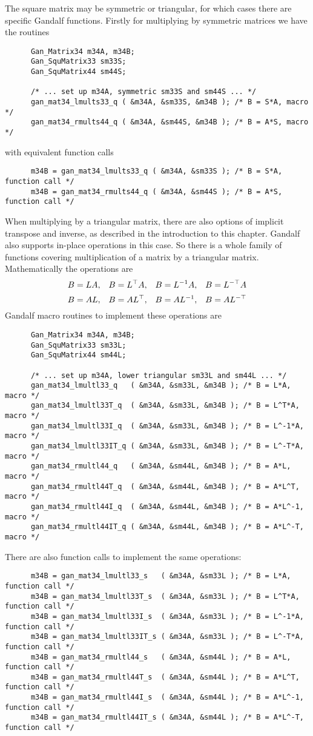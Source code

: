 The square matrix may be symmetric or triangular, for which cases there
are specific Gandalf functions. Firstly for multiplying by symmetric matrices
we have the routines
\begin{verbatim}
      Gan_Matrix34 m34A, m34B;
      Gan_SquMatrix33 sm33S;
      Gan_SquMatrix44 sm44S;

      /* ... set up m34A, symmetric sm33S and sm44S ... */
      gan_mat34_lmults33_q ( &m34A, &sm33S, &m34B ); /* B = S*A, macro */
      gan_mat34_rmults44_q ( &m34A, &sm44S, &m34B ); /* B = A*S, macro */
\end{verbatim}
with equivalent function calls
\begin{verbatim}
      m34B = gan_mat34_lmults33_q ( &m34A, &sm33S ); /* B = S*A, function call */
      m34B = gan_mat34_rmults44_q ( &m34A, &sm44S ); /* B = A*S, function call */
\end{verbatim}
When multiplying by a triangular matrix, there are also options of implicit
transpose and inverse, as described in the introduction to this chapter.
Gandalf also supports in-place operations in this case. So there is a whole
family of functions covering multiplication of a matrix by a triangular
matrix. Mathematically the operations are
\[ B=LA, \;\;\; B=L^{\top} A, \;\;\; B=L^{-1} A, \;\;\; B=L^{-\top} A
\]
\[ B=AL, \;\;\; B=AL^{\top}, \;\;\; B=AL^{-1}, \;\;\; B=AL^{-\top}
\]
Gandalf macro routines to implement these operations are
\begin{verbatim}
      Gan_Matrix34 m34A, m34B;
      Gan_SquMatrix33 sm33L;
      Gan_SquMatrix44 sm44L;

      /* ... set up m34A, lower triangular sm33L and sm44L ... */
      gan_mat34_lmultl33_q   ( &m34A, &sm33L, &m34B ); /* B = L*A,    macro */
      gan_mat34_lmultl33T_q  ( &m34A, &sm33L, &m34B ); /* B = L^T*A,  macro */
      gan_mat34_lmultl33I_q  ( &m34A, &sm33L, &m34B ); /* B = L^-1*A, macro */
      gan_mat34_lmultl33IT_q ( &m34A, &sm33L, &m34B ); /* B = L^-T*A, macro */
      gan_mat34_rmultl44_q   ( &m34A, &sm44L, &m34B ); /* B = A*L,    macro */
      gan_mat34_rmultl44T_q  ( &m34A, &sm44L, &m34B ); /* B = A*L^T,  macro */
      gan_mat34_rmultl44I_q  ( &m34A, &sm44L, &m34B ); /* B = A*L^-1, macro */
      gan_mat34_rmultl44IT_q ( &m34A, &sm44L, &m34B ); /* B = A*L^-T, macro */
\end{verbatim}
There are also function calls to implement the same operations:
\begin{verbatim}
      m34B = gan_mat34_lmultl33_s   ( &m34A, &sm33L ); /* B = L*A,    function call */
      m34B = gan_mat34_lmultl33T_s  ( &m34A, &sm33L ); /* B = L^T*A,  function call */
      m34B = gan_mat34_lmultl33I_s  ( &m34A, &sm33L ); /* B = L^-1*A, function call */
      m34B = gan_mat34_lmultl33IT_s ( &m34A, &sm33L ); /* B = L^-T*A, function call */
      m34B = gan_mat34_rmultl44_s   ( &m34A, &sm44L ); /* B = A*L,    function call */
      m34B = gan_mat34_rmultl44T_s  ( &m34A, &sm44L ); /* B = A*L^T,  function call */
      m34B = gan_mat34_rmultl44I_s  ( &m34A, &sm44L ); /* B = A*L^-1, function call */
      m34B = gan_mat34_rmultl44IT_s ( &m34A, &sm44L ); /* B = A*L^-T, function call */
\end{verbatim}
